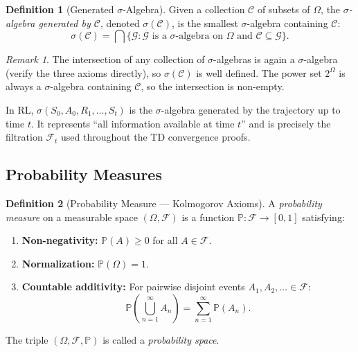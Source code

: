 \documentclass[11pt,a4paper]{article}
\theoremstyle{definition}
\newtheorem{definition}{Definition}[section]
\theoremstyle{plain}
\theoremstyle{remark}
\newtheorem{remark}{Remark}[section]
\newcommand{\Prob}{\mathbb{P}}
\begin{document}
\begin{definition}[Generated $\sigma$-Algebra]
\label{def:generated_sigma}
Given a collection $\mathcal{C}$ of subsets of $\Omega$, the \emph{$\sigma$-algebra generated by $\mathcal{C}$}, denoted $\sigma(\mathcal{C})$, is the smallest $\sigma$-algebra containing $\mathcal{C}$:
\begin{equation}
    \sigma(\mathcal{C}) = \bigcap \{ \mathcal{G} : \mathcal{G} \text{ is a $\sigma$-algebra on } \Omega \text{ and } \mathcal{C} \subseteq \mathcal{G} \}.
    \label{eq:generated_sigma}
\end{equation}
\end{definition}

\begin{remark}
The intersection of any collection of $\sigma$-algebras is again a $\sigma$-algebra (verify the three axioms directly), so $\sigma(\mathcal{C})$ is well defined. The power set $2^\Omega$ is always a $\sigma$-algebra containing $\mathcal{C}$, so the intersection is non-empty.
\end{remark}

\begin{rlconnection}[Connection to RL]
In RL, $\sigma(S_0, A_0, R_1, \ldots, S_t)$ is the $\sigma$-algebra generated by the trajectory up to time $t$. It represents ``all information available at time $t$'' and is precisely the filtration $\mathcal{F}_t$ used throughout the TD convergence proofs.
\end{rlconnection}

\subsection{Probability Measures}
\label{subsec:prob_measures}

\begin{definition}[Probability Measure --- Kolmogorov Axioms]
\label{def:prob_measure}
A \emph{probability measure} on a measurable space $(\Omega, \mathcal{F})$ is a function $\Prob: \mathcal{F} \to [0,1]$ satisfying:
\begin{enumerate}[nosep]
    \item \textbf{Non-negativity:} $\Prob(A) \geq 0$ for all $A \in \mathcal{F}$.
    \item \textbf{Normalization:} $\Prob(\Omega) = 1$.
    \item \textbf{Countable additivity:} For pairwise disjoint events $A_1, A_2, \ldots \in \mathcal{F}$:
    \begin{equation}
        \Prob\!\left(\bigcup_{n=1}^\infty A_n\right) = \sum_{n=1}^\infty \Prob(A_n).
        \label{eq:countable_additivity}
    \end{equation}
\end{enumerate}
The triple $(\Omega, \mathcal{F}, \Prob)$ is called a \emph{probability space}.
\end{definition}
\end{document}
